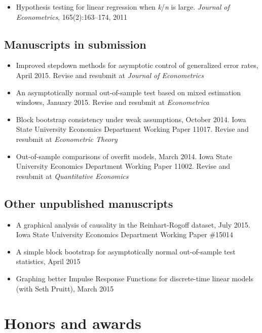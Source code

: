 \documentclass[12pt]{article}%
\begin{document}
\begin{itemize}
\item Hypothesis testing for linear regression when
\textit{k}/\textit{n} is large. \textit{Journal of Econometrics},
165(2):163--174, 2011
\end{itemize}

\subsection*{Manuscripts in submission}

\begin{itemize}
\item Improved stepdown methods for asymptotic control of generalized
error rates, April 2015. Revise and resubmit at \textit{Journal of
Econometrics}
\item An asymptotically normal out-of-sample test based on mixed
estimation windows, January 2015. Revise and resubmit at
\textit{Econometrica}
\item Block bootstrap consistency under weak assumptions, October
2014.  Iowa State University Economics Department Working Paper
11017. Revise and resubmit at \textit{Econometric Theory}
\item Out-of-sample comparisons of overfit models, March 2014. Iowa
State University Economics Department Working Paper 11002. Revise and
resubmit at \textit{Quantitative Economics}
\end{itemize}

\subsection*{Other unpublished manuscripts}
\begin{itemize}
\item A graphical analysis of causality in the Reinhart-Rogoff
dataset, July 2015. Iowa State University Economics Department Working
Paper \#15014
\item A simple block bootstrap for asymptotically normal out-of-sample
test statistics, April 2015
\item Graphing better Impulse Response Functions for discrete-time
linear models (with Seth Pruitt), March 2015
\end{itemize}

\section*{Honors and awards}
\end{document}
